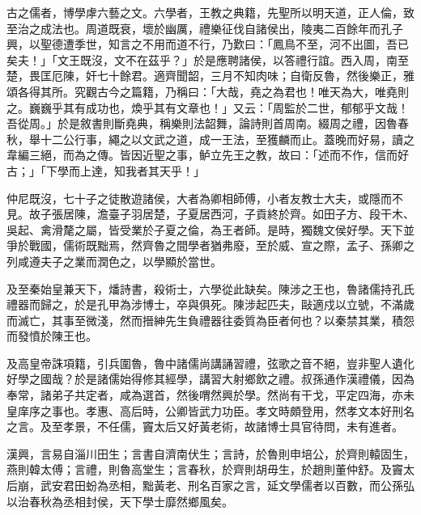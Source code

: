 
\begin{pinyinscope}
古之儒者，博學虖六藝之文。六學者，王教之典籍，先聖所以明天道，正人倫，致至治之成法也。周道既衰，壞於幽厲，禮樂征伐自諸侯出，陵夷二百餘年而孔子興，以聖德遭季世，知言之不用而道不行，乃歎曰：「鳳鳥不至，河不出圖，吾已矣夫！」「文王既沒，文不在茲乎？」於是應聘諸侯，以答禮行誼。西入周，南至楚，畏匡厄陳，奸七十餘君。適齊聞韶，三月不知肉味；自衛反魯，然後樂正，雅頌各得其所。究觀古今之篇籍，乃稱曰：「大哉，堯之為君也！唯天為大，唯堯則之。巍巍乎其有成功也，煥乎其有文章也！」又云：「周監於二世，郁郁乎文哉！吾從周。」於是敘書則斷堯典，稱樂則法韶舞，論詩則首周南。綴周之禮，因魯春秋，舉十二公行事，繩之以文武之道，成一王法，至獲麟而止。蓋晚而好易，讀之韋編三絕，而為之傳。皆因近聖之事，鲈立先王之教，故曰：「述而不作，信而好古；」「下學而上達，知我者其天乎！」

仲尼既沒，七十子之徒散遊諸侯，大者為卿相師傅，小者友教士大夫，或隱而不見。故子張居陳，澹臺子羽居楚，子夏居西河，子貢終於齊。如田子方、段干木、吳起、禽滑氂之屬，皆受業於子夏之倫，為王者師。是時，獨魏文侯好學。天下並爭於戰國，儒術既黜焉，然齊魯之間學者猶弗廢，至於威、宣之際，孟子、孫卿之列咸遵夫子之業而潤色之，以學顯於當世。

及至秦始皇兼天下，燔詩書，殺術士，六學從此缺矣。陳涉之王也，魯諸儒持孔氏禮器而歸之，於是孔甲為涉博士，卒與俱死。陳涉起匹夫，敺適戍以立號，不滿歲而滅亡，其事至微淺，然而搢紳先生負禮器往委質為臣者何也？以秦禁其業，積怨而發憤於陳王也。

及高皇帝誅項籍，引兵圍魯，魯中諸儒尚講誦習禮，弦歌之音不絕，豈非聖人遺化好學之國哉？於是諸儒始得修其經學，講習大射鄉飲之禮。叔孫通作漢禮儀，因為奉常，諸弟子共定者，咸為選首，然後喟然興於學。然尚有干戈，平定四海，亦未皇庠序之事也。孝惠、高后時，公卿皆武力功臣。孝文時頗登用，然孝文本好刑名之言。及至孝景，不任儒，竇太后又好黃老術，故諸博士具官待問，未有進者。

漢興，言易自淄川田生；言書自濟南伏生；言詩，於魯則申培公，於齊則轅固生，燕則韓太傅；言禮，則魯高堂生；言春秋，於齊則胡毋生，於趙則董仲舒。及竇太后崩，武安君田蚡為丞相，黜黃老、刑名百家之言，延文學儒者以百數，而公孫弘以治春秋為丞相封侯，天下學士靡然鄉風矣。


\end{pinyinscope}
